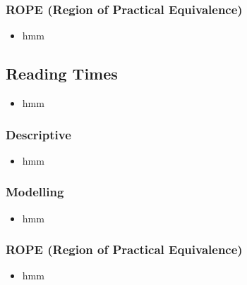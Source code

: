 \documentclass[
  10pt,
  english,
  doc,floatsintext]{apa6}
\providecommand{\tightlist}{%
  \setlength{\itemsep}{0pt}\setlength{\parskip}{0pt}}
\begin{document}
\hypertarget{rope-region-of-practical-equivalence-4}{%
\subsubsection{ROPE (Region of Practical Equivalence)}\label{rope-region-of-practical-equivalence-4}}

\begin{itemize}
\tightlist
\item
  hmm
\end{itemize}

\hypertarget{reading-times-2}{%
\subsection{Reading Times}\label{reading-times-2}}

\begin{itemize}
\tightlist
\item
  hmm
\end{itemize}

\hypertarget{descriptive-4}{%
\subsubsection{Descriptive}\label{descriptive-4}}

\begin{itemize}
\tightlist
\item
  hmm
\end{itemize}

\hypertarget{modelling-4}{%
\subsubsection{Modelling}\label{modelling-4}}

\begin{itemize}
\tightlist
\item
  hmm
\end{itemize}

\hypertarget{rope-region-of-practical-equivalence-5}{%
\subsubsection{ROPE (Region of Practical Equivalence)}\label{rope-region-of-practical-equivalence-5}}

\begin{itemize}
\tightlist
\item
  hmm
\end{itemize}
\end{document}
